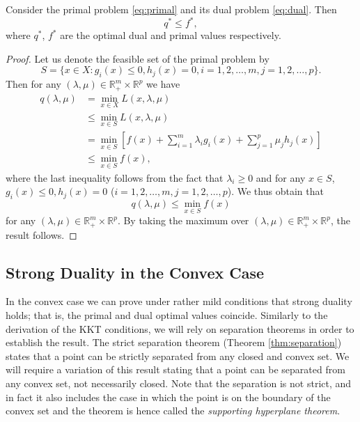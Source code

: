 \documentclass[10pt,a4paper]{article}
\begin{document}
\begin{theorem}\label{thm:weak_duality}
	Consider the primal problem \eqref{eq:primal} and its dual problem \eqref{eq:dual}. Then
	\begin{equation*}
		q^* \leq f^*,
	\end{equation*}
	where $q^*$, $f^*$ are the optimal dual and primal values respectively.
\end{theorem}

\begin{proof}
	Let us denote the feasible set of the primal problem by
	\begin{equation*}
		S = \{x \in X : g_i(x) \leq 0, h_j(x) = 0, i = 1, 2, \ldots, m, j = 1, 2, \ldots, p\}.
	\end{equation*}
	Then for any $(\lambda, \mu) \in \mathbb{R}_+^m \times \mathbb{R}^p$ we have
	\begin{align*}
		q(\lambda, \mu) &= \min_{x \in X} L(x, \lambda, \mu) \\
		&\leq \min_{x \in S} L(x, \lambda, \mu) \\
		&= \min_{x \in S} \left[ f(x) + \sum_{i=1}^{m} \lambda_i g_i(x) + \sum_{j=1}^{p} \mu_j h_j(x) \right] \\
		&\leq \min_{x \in S} f(x),
	\end{align*}
	where the last inequality follows from the fact that $\lambda_i \geq 0$ and for any $x \in S$, $g_i(x) \leq
	0, h_j(x) = 0$ ($i = 1, 2, \ldots, m, j = 1, 2, \ldots, p$). We thus obtain that
	\begin{equation*}
		q(\lambda, \mu) \leq \min_{x \in S} f(x)
	\end{equation*}
	for any $(\lambda, \mu) \in \mathbb{R}_+^m \times \mathbb{R}^p$. By taking the maximum over $(\lambda, \mu) \in \mathbb{R}_+^m \times \mathbb{R}^p$, the result
	follows.
\end{proof}

\subsection{Strong Duality in the Convex Case}

In the convex case we can prove under rather mild conditions that strong duality holds;
that is, the primal and dual optimal values coincide. Similarly to the derivation of the
KKT conditions, we will rely on separation theorems in order to establish the result.
The strict separation theorem (Theorem \ref{thm:separation}) states that a point can
be strictly separated from any closed and convex set. We will require a variation of this
result stating that a point can be separated from any convex set, not necessarily closed.
Note that the separation is not strict, and in fact it also includes the case in which the
point is on the boundary of the convex set and the theorem is hence called the \emph{supporting
	hyperplane theorem}.
\end{document}

